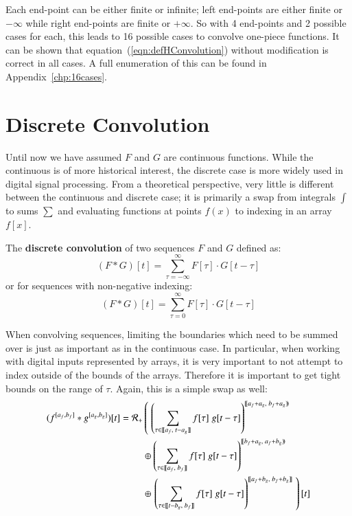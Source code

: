 Each end-point can be either finite or infinite; left end-points are either finite or $-\infty$ while right end-points are finite
or $+\infty$.
So with 4 end-points and 2 possible cases for each, this leads to 16 possible cases to convolve one-piece functions.
It can be shown that equation~(\ref{eqn:defHConvolution}) without modification is correct in all cases.
A full enumeration of this can be found in Appendix~\ref{chp:16cases}.

%
%
\section{Discrete Convolution}

Until now we have assumed $F$ and $G$ are continuous functions. 
While the continuous is of more historical interest, the discrete case is more widely used in digital signal processing.
From a theoretical perspective, very little is different between the continuous and discrete case; it is primarily a swap
from integrals $\int$ to sums $\sum$ and evaluating functions at points $f(x)$ to indexing in an array $f[x]$.




\begin{definition}
	The \textbf{discrete convolution} of two sequences $F$ and $G$ defined as:
	\begin{equation}
		(F*G)[t] = \sum_{\tau=-\infty}^\infty F[\tau] \cdot G[t-\tau]
	\end{equation}
	or for sequences with non-negative indexing:
	\begin{equation}
		(F*G)[t] = \sum_{\tau=0}^\infty F[\tau] \cdot G[t-\tau]
	\end{equation}
\end{definition}

When convolving sequences, limiting the boundaries which need to be summed over is just as important as in the
continuous case.
In particular, when working with digital inputs represented by arrays, it is very important to not attempt to index outside of
the bounds of the arrays.
Therefore it is important to get tight bounds on the range of $\tau$.
Again, this is a simple swap as well:
\begin{align}
	(f^{[a_f,b_f]} * g^{[a_g, b_g]})[t] = 
		\R[+] &\left( \; \left( 
			\sum_{\tau \in [\![a_f,\;t-a_g]\!]} f[\tau] \; g[t-\tau] \right)^{[\![a_f+a_g,\; b_f+a_g)\!)} 
				\right. \notag \\ &\oplus \left( 
			\sum_{\tau \in [\![a_f,\;b_f]\!]} f[\tau] \; g[t-\tau] \right)^{[\![b_f+a_g,\; a_f+b_g)\!)} 
				\notag \\ &\oplus \left. \left( 
			\sum_{\tau \in [\![t-b_g,\;b_f]\!]} f[\tau] \; g[t-\tau] \right)^{[\![a_f+b_g,\; b_f+b_g]\!]} 
				\; \right)[t]
\end{align}

